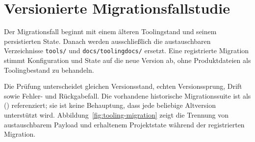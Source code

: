 \section{Versionierte Migrationsfallstudie}
\label{chap:versioned-migration-case}

Der Migrationsfall beginnt mit einem älteren Toolingstand und seinem persistierten State.
Danach werden ausschließlich die austauschbaren Verzeichnisse \texttt{tools/} und
\texttt{docs/toolingdocs/} ersetzt. Eine registrierte Migration stimmt Konfiguration und
State auf die neue Version ab, ohne Produktdateien als Toolingbestand zu behandeln.

Die Prüfung unterscheidet gleichen Versionsstand, echten Versionssprung, Drift sowie
Fehler- und Rückgabefall. Die vorhandene historische Migrationssuite ist als \Verified{}
() referenziert; sie ist keine Behauptung, dass jede beliebige
Altversion unterstützt wird.
Abbildung~\ref{fig:tooling-migration} zeigt die Trennung von austauschbarem Payload
und erhaltenem Projektstate während der registrierten Migration.

